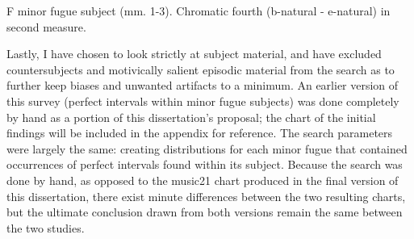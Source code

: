 \begin{Example}[H]
    \begin{center}
    \caption[F minor fugue subject (mm. 1-3). ]{ F minor fugue subject (mm. 1-3). Chromatic fourth (b-natural - e-natural) in second measure.}
    \end{center}
\end{Example}
    
    Lastly, I have chosen to look strictly at subject material, and have
excluded countersubjects and motivically salient episodic material from
the search as to further keep biases and unwanted artifacts to a
minimum. An earlier version of this survey (perfect intervals within
minor fugue subjects) was done completely by hand as a portion of this
dissertation's proposal; the chart of the initial findings will be
included in the appendix for reference. The search parameters were
largely the same: creating distributions for each minor fugue that
contained occurrences of perfect intervals found within its subject.
Because the search was done by hand, as opposed to the music21 chart
produced in the final version of this dissertation, there exist minute
differences between the two resulting charts, but the ultimate
conclusion drawn from both versions remain the same between the two
studies.

